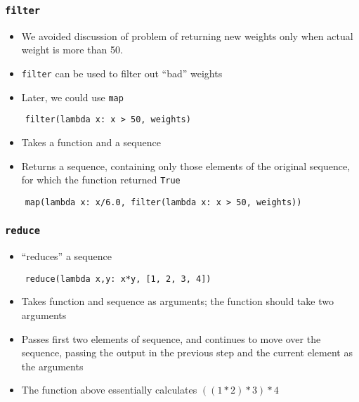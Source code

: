 \begin{frame}[fragile]
  \frametitle{\texttt{filter}}

  \begin{itemize}
  \item We avoided discussion of problem of returning new weights only
    when actual weight is more than 50. 
  \item \texttt{filter} can be used to filter out ``bad'' weights
  \item Later, we could use \texttt{map}
  \end{itemize}
  \begin{lstlisting}
    filter(lambda x: x > 50, weights)
  \end{lstlisting}
  \begin{itemize}
  \item Takes a function and a sequence
  \item Returns a sequence, containing only those elements of the
    original sequence, for which the function returned \texttt{True}
  \end{itemize}
  \begin{lstlisting}
    map(lambda x: x/6.0, filter(lambda x: x > 50, weights))
  \end{lstlisting}
\end{frame}

\begin{frame}[fragile]
  \frametitle{\texttt{reduce}}
  \begin{itemize}
  \item ``reduces'' a sequence
  \end{itemize}
  \begin{lstlisting}
    reduce(lambda x,y: x*y, [1, 2, 3, 4])
  \end{lstlisting}
  \begin{itemize}
  \item Takes function and sequence as arguments; the function should
    take two arguments
  \item Passes first two elements of sequence, and continues to move
    over the sequence, passing the output in the previous step and the
    current element as the arguments
  \item The function above essentially calculates $((1*2)*3)*4$ 
  \end{itemize}
\end{frame}

